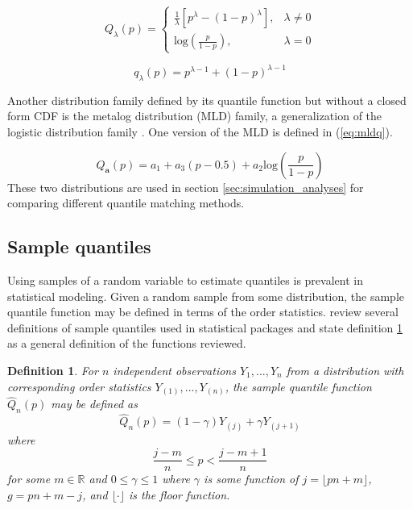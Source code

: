 \documentclass[preprint,12pt,authoryear]{elsarticle}
\newtheorem{definition}{Definition}
\newcommand{\1}[1]{\mathds{1}\left[#1\right]}
\begin{document}
\begin{equation}
    \label{eq:tuk_lam}
    Q_{\lambda}(p) = \begin{cases} 
      \frac{1}{\lambda} \left[p^{\lambda} - (1 - p)^{\lambda} \right], & \lambda \neq 0 \\
      \text{log} \left(\frac{p}{1 - p} \right), & \lambda = 0
   \end{cases}
\end{equation}

\begin{equation}
    \label{eq:tuk_lam_qd}
    q_{\lambda}(p) = p^{\lambda - 1} + (1-p)^{\lambda -1} 
\end{equation}

Another distribution family defined by its quantile function but without a 
closed form CDF is the metalog distribution (MLD) family, a generalization of 
the logistic distribution family \cite[]{keelin2016metalog}. One version of the 
MLD is defined in (\ref{eq:mldq}).

\begin{equation}
    \label{eq:mldq}
    Q_{\textbf{a}}(p) = a_1 + a_3(p - 0.5) + a_2\text{log}\left(\frac{p}{1-p} \right)
\end{equation}
These two distributions are used in section \ref{sec:simulation_analyses} 
for comparing different quantile matching methods.


















\subsection{Sample quantiles} \label{sec:samp_quants}

Using samples of a random variable to estimate quantiles is prevalent in 
statistical modeling. Given a random sample from some distribution, the sample 
quantile function may be defined in terms of the order statistics. 
\cite{hyndman1996sample} review several definitions of sample quantiles used in 
statistical packages and state definition \ref{def:sqf} as a general definition 
of the functions reviewed. 

\begin{definition}
For $n$ independent observations $Y_1, ..., Y_n$ from a distribution with 
corresponding order statistics $Y_{(1)}, ..., Y_{(n)}$, the sample quantile 
function $\hat{Q}_n(p)$ may be defined as
    \label{def:sqf}
    \begin{equation}
        \label{eq:quant_df}
        \hat{Q}_n(p) = (1- \gamma)Y_{(j)} + \gamma Y_{(j + 1)}
    \end{equation}
    where 
    \[\frac{j - m}{n} \leq p < \frac{j - m + 1}{n}
    \]
    for some $m \in \mathbb{R}$ and $0 \leq \gamma \leq 1$ where 
    $\gamma$ is some function of $j = \lfloor pn + m \rfloor$,  
    $g = pn + m - j$, and $\lfloor \cdot \rfloor$ is the floor function.
\end{definition}
\end{document}

